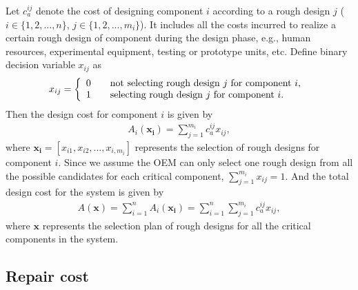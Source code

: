 \documentclass[preprint,12pt]{elsarticle}
\begin{document}
	Let $c^{ij}_{a}$ denote the cost of designing component $i$ according to a rough design $j$ ($i \in \{1,2,...,n\}$, $j \in \{1,2,...,m_i\}$). It includes all the costs incurred to realize a certain rough design of component during the design phase, e.g., human resources, experimental equipment, testing or prototype units, etc. Define binary decision variable $x_{ij}$ as
	\[ x_{ij} = \left \{
	  \begin{array} {l l}
		0 & \quad \text {not selecting rough design $j$ for component $i$, } \\
		1 & \quad \text {selecting rough design $j$ for component $i$. }
		\end {array} \right.\]
		Then the design cost for component $i$ is given by
	 \begin{eqnarray}
	A_{i}(\boldsymbol{x_{i}})=\sum^{m_{i}}_{j=1} {c^{ij}_{a} x_{ij}},
\label{Ai}
		 \end{eqnarray}
		 where $\boldsymbol{x_{i}}=[x_{i1},x_{i2},...,x_{i,m_i}]$ represents the selection of rough designs for component $i$. Since we assume the OEM can only select one rough design from all the possible candidates for each critical component, $\sum^{m_{i}}_{j=1}{x_{ij}=1}$.
And the total design cost for the system is given by
\begin{eqnarray}
	A(\boldsymbol{x})=\sum ^{n}_{i=1}A_{i}(\boldsymbol{x_{i}})=\sum ^{n}_{i=1}\sum^{m_{i}}_{j=1} {c^{ij}_{a} x_{ij}}, \label{A}
\end{eqnarray}
where $\boldsymbol{x}$ represents the selection plan of rough designs for all the critical components in the system.
	
\subsection{Repair cost}
	
\end{document}
